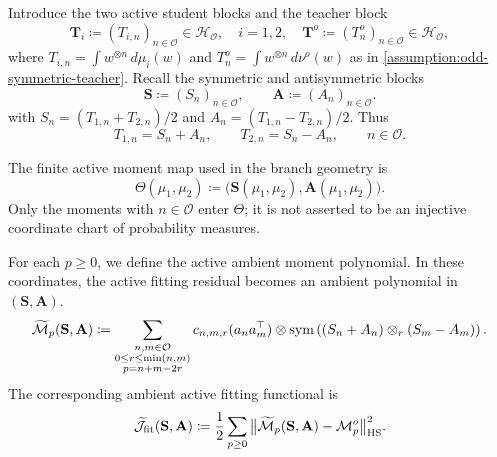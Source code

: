 \begin{definition}
Introduce the two active student blocks and the teacher block
\begin{equation}
    \mathbf T_i
    \coloneq
    (T_{i,n})_{n\in \mathcal O}
    \in \mathcal H_{\mathcal O},\quad i=1,2,
    \quad 
    \mathbf T^o
    \coloneq
    (T_n^o)_{n\in \mathcal O}
    \in \mathcal H_{\mathcal O},
\end{equation}
where $T_{i,n}=\int w^{\otimes n}\,d\mu_i(w)$ and
$T_n^o=\int w^{\otimes n}\,d\nu^o(w)$ as in
\cref{assumption:odd-symmetric-teacher}. Recall the symmetric and
antisymmetric blocks
\begin{equation}
\label{eq:mf-symmetric-antisymmetric-active-blocks}
    \mathbf S
    \coloneq
    (S_n)_{n\in \mathcal O},
    \qquad
    \mathbf A
    \coloneq
    (A_n)_{n\in \mathcal O}.
\end{equation}
with $S_n=(T_{1,n}+T_{2,n})/2$ and
$A_n=(T_{1,n}-T_{2,n})/2$. Thus
\begin{equation}
    T_{1,n}=S_n+A_n,
    \qquad
    T_{2,n}=S_n-A_n,
    \qquad
    n\in \mathcal O.
\end{equation}

The finite active moment map used in the branch geometry is
\begin{equation}
\label{eq:mf-finite-active-moment-map}
    \Theta(\mu_1,\mu_2)
    \coloneq
    \bigl(\mathbf S(\mu_1,\mu_2),\mathbf A(\mu_1,\mu_2)\bigr).
\end{equation}
Only the moments with $n\in\mathcal O$ enter $\Theta$; it is not asserted
to be an injective coordinate chart of probability measures.

For each $p\ge 0$, we define the active ambient moment polynomial. In these coordinates, the active fitting residual becomes an ambient polynomial
in \((\mathbf S,\mathbf A)\).
\begin{equation}
\label{eq:ambient-active-reduced-M}
    \widetilde{\mathcal M}_p(\mathbf S,\mathbf A)
    \coloneq
    \sum_{\substack{n,m\in \mathcal O\\ 0\le r\le \min(n,m)\\ p=n+m-2r}}
    c_{n,m,r}(a_n a_m^\top)\otimes
    \mathrm{sym}\left({(S_n+A_n)\otimes_{r}(S_m-A_m)}\right).
\end{equation}
The corresponding ambient active fitting functional is
\begin{equation}
\label{eq:ambient-active-fit-functional}
    \widetilde{\mathcal J}_{\mathrm{fit}}(\mathbf S,\mathbf A)
    \coloneq
    \frac12\sum_{p\ge 0}
    \big\|
        \widetilde{\mathcal M}_p(\mathbf S,\mathbf A)-\mathcal M_p^o
    \big\|_{\mathrm{HS}}^2.
\end{equation}
\end{definition}

